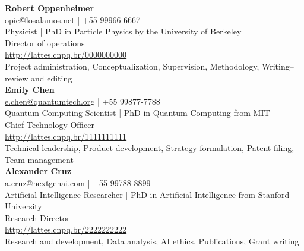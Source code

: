 \noindent \sffamily \large{\textbf{Robert Oppenheimer}} \rmfamily\\ [3mm]\small{\href{mailto:opie@losalamos.net}{opie@losalamos.net} | +55 99966-6667 \\Physicist | PhD in Particle Physics by the University of Berkeley \\Director of operations \\\href{http://lattes.cnpq.br/0000000000}{http://lattes.cnpq.br/0000000000} \\ [3mm]}Project administration, Conceptualization, Supervision, Methodology, Writing– review and editing \\

\noindent \sffamily \large{\textbf{Emily Chen}} \rmfamily\\ [3mm]\small{\href{mailto:e.chen@quantumtech.org}{e.chen@quantumtech.org} | +55 99877-7788 \\Quantum Computing Scientist | PhD in Quantum Computing from MIT \\Chief Technology Officer \\\href{http://lattes.cnpq.br/1111111111}{http://lattes.cnpq.br/1111111111} \\ [3mm]}Technical leadership, Product development, Strategy formulation, Patent filing, Team management \\

\noindent \sffamily \large{\textbf{Alexander Cruz}} \rmfamily\\ [3mm]\small{\href{mailto:a.cruz@nextgenai.com}{a.cruz@nextgenai.com} | +55 99788-8899 \\Artificial Intelligence Researcher | PhD in Artificial Intelligence from Stanford University \\Research Director \\\href{http://lattes.cnpq.br/2222222222}{http://lattes.cnpq.br/2222222222} \\ [3mm]}Research and development, Data analysis, AI ethics, Publications, Grant writing \\

